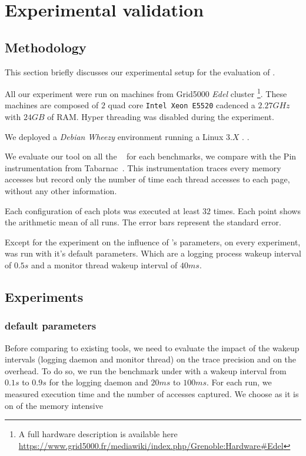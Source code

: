 \section{Experimental validation}
\label{sec:expe}

\subsection{Methodology}
\label{sec:exp-methodo}

This section briefly discusses our experimental setup for the evaluation of
\Moca.

All our experiment were run on  machines from Grid5000 \emph{Edel} cluster
\footnote{A full hardware description is available here
    \url{https://www.grid5000.fr/mediawiki/index.php/Grenoble:Hardware\#Edel}}.
    These machines are composed of $2$ quad core \texttt{Intel Xeon E5520}
    cadenced a $2.27GHz$ with
    $24 GB$ of RAM. Hyper threading was disabled during the experiment.

We deployed a \emph{Debian} \emph{Wheezy} environment running a Linux $3.X$
.
.

We evaluate our tool on all the \NPB~\cite{Jin1999} for
each benchmarks, we compare \Moca with the Pin~\cite{Luk05Pin} instrumentation
from Tabarnac~\cite{Beniamine15TABARNACRR}. This instrumentation traces every
memory accesses but record only the number of time each thread accesses to
each page, without any other information.

Each configuration of each plots was executed at least $32$ times. Each point
shows the arithmetic mean of all runs. The error bars represent
the standard error.

Except for the experiment on the influence of \Moca's parameters, on every
experiment, \Moca was run with it's default parameters. Which are a logging
process wakeup interval of $0.5s$ and a monitor thread wakeup interval
of $40ms$.


\subsection{Experiments}
\label{sec:expe-ovh}

\subsubsection{\Moca default parameters}


Before comparing \Moca to existing tools, we need to evaluate the impact of
the wakeup intervals (logging daemon and monitor thread) on the trace
precision and on the overhead. To do so, we run the \IS benchmark under \Moca with
a wakeup interval from $0.1s$ to  $0.9s$ for the logging daemon and $20ms$ to
$100ms$. For each run, we measured \IS execution time and the number of
accesses captured. We choose \IS as it is on of the memory intensive \NPB

